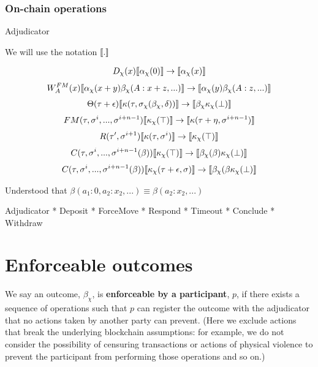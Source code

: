 \subsubsection{On-chain operations}

Adjudicator

We will use the notation $\llbracket . \rrbracket$

\begin{align*}
D_\chi(x) \llbracket \alpha_\chi(0) \rrbracket \rightarrow \llbracket \alpha_\chi(x) \rrbracket
\end{align*}
\begin{align*}
W^{FM}_A(x) \llbracket \alpha_\chi(x + y)\beta_\chi(A: x + z, ...) \rrbracket \rightarrow \llbracket \alpha_\chi(y)\beta_\chi(A: z, ...) \rrbracket
\end{align*}
\begin{align*}
\Theta(\tau + \epsilon) \llbracket \kappa(\tau, \sigma_\chi(\beta_\chi, \delta)) \rrbracket \rightarrow \llbracket \beta_\chi \kappa_\chi(\bot) \rrbracket
\end{align*}
\begin{align*}
FM(\tau, \sigma^i, ..., \sigma^{i+n-1}) \llbracket \kappa_\chi(\top) \rrbracket \rightarrow \llbracket \kappa(\tau + \eta, \sigma^{i+n-1}) \rrbracket
\end{align*}
\begin{align*}
R(\tau', \sigma^{i+1})\llbracket \kappa(\tau, \sigma^i) \rrbracket \rightarrow \llbracket \kappa_\chi(\top) \rrbracket
\end{align*}
\begin{align*}
C(\tau, \sigma^i, ..., \sigma^{i+n-1}(\beta)) \llbracket \kappa_\chi(\top) \rrbracket \rightarrow \llbracket \beta_\chi(\beta) \kappa_\chi(\bot) \rrbracket
\end{align*}
\begin{align*}
C(\tau, \sigma^i, ..., \sigma^{i+n-1}(\beta)) \llbracket \kappa_\chi(\tau + \epsilon, \sigma) \rrbracket \rightarrow \llbracket \beta_\chi(\beta \kappa_\chi(\bot) \rrbracket
\end{align*}

Understood that $\beta(a_1: 0, a_2:x_2,...) \equiv \beta(a_2:x_2, ...)$


Adjudicator
* Deposit
* ForceMove
* Respond
* Timeout
* Conclude
* Withdraw

\section{Enforceable outcomes}

We say an outcome, $\beta_\chi$, is \textbf{enforceable by a participant}, $p$, if there exists a sequence of operations such that $p$ can register the outcome with the adjudicator that no actions taken by another party can prevent. (Here we exclude actions that break the underlying blockchain assumptions: for example, we do not consider the possibility of censuring transactions or actions of physical violence to prevent the participant from performing those operations and so on.)

